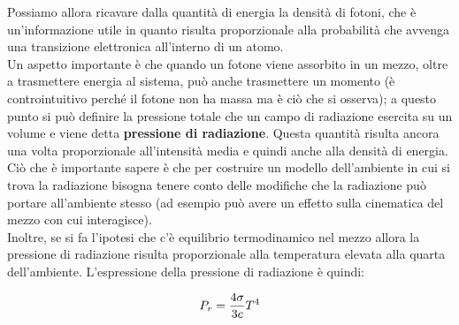\documentclass[a4paper,11pt]{article}
\begin{document}
Possiamo allora ricavare dalla quantità di energia la densità di fotoni, che è un'informazione utile in quanto risulta proporzionale alla probabilità che avvenga una transizione elettronica all'interno di un atomo.
\\ Un aspetto importante è che quando un fotone viene assorbito in un mezzo, oltre a trasmettere energia al sistema, può anche trasmettere un momento (è controintuitivo perché il fotone non ha massa ma è ciò che si osserva); a questo punto si può definire la pressione totale che un campo di radiazione esercita su un volume e viene detta \textbf{pressione di radiazione}. Questa quantità risulta ancora una volta proporzionale all'intensità media e quindi anche alla densità di energia. Ciò che è importante sapere è che per costruire un modello dell'ambiente in cui si trova la radiazione bisogna tenere conto delle modifiche che la radiazione può portare all'ambiente stesso (ad esempio può avere un effetto sulla cinematica del mezzo con cui interagisce). \\ Inoltre, se si fa l'ipotesi che c'è equilibrio termodinamico nel mezzo allora la pressione di radiazione risulta proporzionale alla temperatura elevata alla quarta dell'ambiente. L'espressione della pressione di radiazione è quindi:

\begin{displaymath}
    {P_r} = {4\sigma \over 3c} T^{4}
\end{displaymath}
\end{document}
